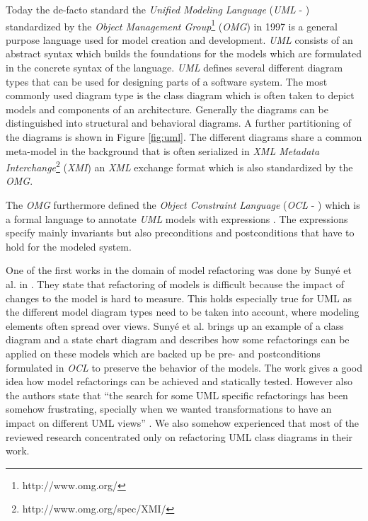\documentclass{llncs}
\begin{document}
Today the de-facto standard the \textit{Unified Modeling Language} (\textit{UML} - \cite{man:UML}) standardized by the
\textit{Object Management Group}\footnote{http://www.omg.org/} (\textit{OMG}) in 1997 is a general purpose language used
for model creation and development. \textit{UML} consists of an abstract syntax which builds the foundations for the
models which are formulated in the concrete syntax of the language. \textit{UML} defines several different diagram types
that can be used for designing parts of a software system. The most commonly used diagram type is the class diagram
which is often taken to depict models and components of an architecture. Generally the diagrams can be distinguished
into structural and behavioral diagrams. A further partitioning of the diagrams is shown in Figure \ref{fig:uml}. The
different diagrams share a common meta-model in the background that is often serialized in \textit{XML Metadata
Interchange}\footnote{http://www.omg.org/spec/XMI/} (\textit{XMI}) an \textit{XML} exchange format which is also
standardized by the \textit{OMG}.

The \textit{OMG} furthermore defined the \textit{Object Constraint Language} (\textit{OCL} - \cite{man:OCL}) which is a
formal language to annotate \textit{UML} models with expressions \cite{man:OCL}. The expressions specify mainly
invariants but also preconditions and postconditions that have to hold for the modeled system.

One of the first works in the domain of model refactoring was done by Suny{\'e} et al. in
\cite{DBLP:conf/uml/SunyePTJ01}. They state that refactoring of models is difficult because the impact of changes to the
model is hard to measure. This holds especially true for UML as the different model diagram types need to be taken into
account, where modeling elements often spread over views. Suny{\'e} et al. brings up an example of a class diagram and a
state chart diagram and describes how some refactorings can be applied on these models which are backed up be pre- and
postconditions formulated in \textit{OCL} to preserve the behavior of the models. The work gives a good idea how model
refactorings can be achieved and statically tested. However also the authors state that ``the search for some UML
specific refactorings has been somehow frustrating, specially when we wanted transformations to have an impact on
different UML views'' \cite{DBLP:conf/uml/SunyePTJ01}. We also somehow experienced that most of the reviewed research
concentrated only on refactoring UML class diagrams in their work.
\end{document}
